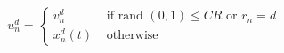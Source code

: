 \begin{equation}
u_{n}^{d}=\left\{\begin{array}{ll}{v_{n}^{d}} & {\text { if rand }(0,1) \leq C R \text { or } r_{n}=d} \\ {x_{n}^{d}(t)} & {\text { otherwise }}\end{array}\right.
\label{cross-over}
\end{equation}